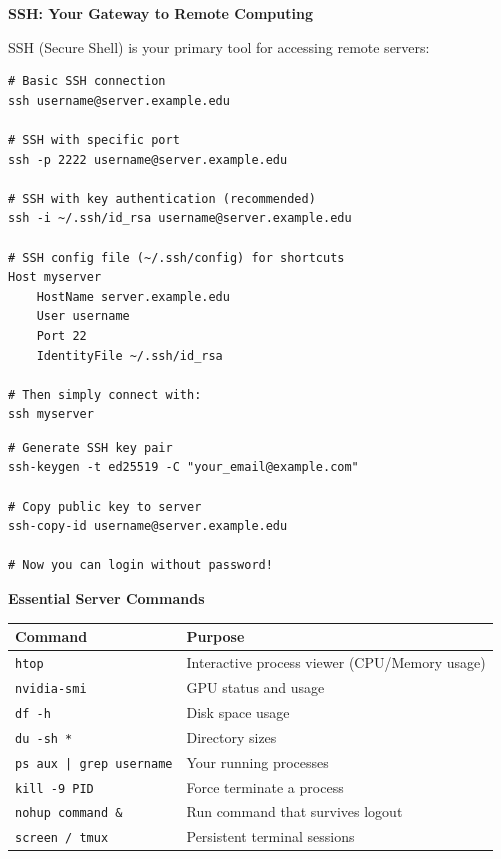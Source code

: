\documentclass[11pt,a4paper]{article}
\begin{document}
\textbf{SSH: Your Gateway to Remote Computing}

SSH (Secure Shell) is your primary tool for accessing remote servers:

\begin{lstlisting}[style=bashstyle]
# Basic SSH connection
ssh username@server.example.edu

# SSH with specific port
ssh -p 2222 username@server.example.edu

# SSH with key authentication (recommended)
ssh -i ~/.ssh/id_rsa username@server.example.edu

# SSH config file (~/.ssh/config) for shortcuts
Host myserver
    HostName server.example.edu
    User username
    Port 22
    IdentityFile ~/.ssh/id_rsa

# Then simply connect with:
ssh myserver
\end{lstlisting}

\begin{tcolorbox}[colback=green!5,colframe=green!50,title={Pro Tip: SSH Key Setup}]
\begin{lstlisting}[style=bashstyle]
# Generate SSH key pair
ssh-keygen -t ed25519 -C "your_email@example.com"

# Copy public key to server
ssh-copy-id username@server.example.edu

# Now you can login without password!
\end{lstlisting}
\end{tcolorbox}

\textbf{Essential Server Commands}

\begin{table}[H]
\centering
\begin{tabular}{ll}
\toprule
\textbf{Command} & \textbf{Purpose} \\
\midrule
\texttt{htop} & Interactive process viewer (CPU/Memory usage) \\
\texttt{nvidia-smi} & GPU status and usage \\
\texttt{df -h} & Disk space usage \\
\texttt{du -sh *} & Directory sizes \\
\texttt{ps aux | grep username} & Your running processes \\
\texttt{kill -9 PID} & Force terminate a process \\
\texttt{nohup command \&} & Run command that survives logout \\
\texttt{screen / tmux} & Persistent terminal sessions \\
\bottomrule
\end{tabular}
\end{table}
\end{document}
